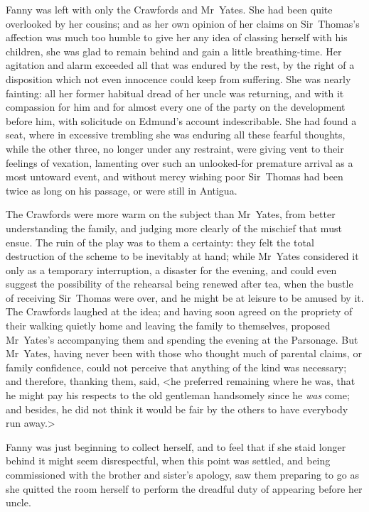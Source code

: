 Fanny was left with only the Crawfords and Mr~Yates. She had been quite overlooked by her cousins; and as her own opinion of her claims on Sir~Thomas's affection was much too humble to give her any idea of classing herself with his children, she was glad to remain behind and gain a little breathing-time. Her agitation and alarm exceeded all that was endured by the rest, by the right of a disposition which not even innocence could keep from suffering. She was nearly fainting: all her former habitual dread of her uncle was returning, and with it compassion for him and for almost every one of the party on the development before him, with solicitude on Edmund's account indescribable. She had found a seat, where in excessive trembling she was enduring all these fearful thoughts, while the other three, no longer under any restraint, were giving vent to their feelings of vexation, lamenting over such an unlooked-for premature arrival as a most untoward event, and without mercy wishing poor Sir~Thomas had been twice as long on his passage, or were still in Antigua.

The Crawfords were more warm on the subject than Mr~Yates, from better understanding the family, and judging more clearly of the mischief that must ensue. The ruin of the play was to them a certainty: they felt the total destruction of the scheme to be inevitably at hand; while Mr~Yates considered it only as a temporary interruption, a disaster for the evening, and could even suggest the possibility of the rehearsal being renewed after tea, when the bustle of receiving Sir~Thomas were over, and he might be at leisure to be amused by it. The Crawfords laughed at the idea; and having soon agreed on the propriety of their walking quietly home and leaving the family to themselves, proposed Mr~Yates's accompanying them and spending the evening at the Parsonage. But Mr~Yates, having never been with those who thought much of parental claims, or family confidence, could not perceive that anything of the kind was necessary; and therefore, thanking them, said, <he preferred remaining where he was, that he might pay his respects to the old gentleman handsomely since he \textit{was}  come; and besides, he did not think it would be fair by the others to have everybody run away.>

Fanny was just beginning to collect herself, and to feel that if she staid longer behind it might seem disrespectful, when this point was settled, and being commissioned with the brother and sister's apology, saw them preparing to go as she quitted the room herself to perform the dreadful duty of appearing before her uncle.

